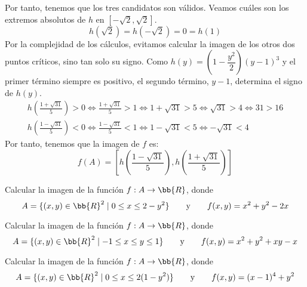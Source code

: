 \begin{ejercicio}
    Por tanto, tenemos que los tres candidatos son válidos. Veamos cuáles son los extremos absolutos de $h$ en $[-\sqrt{2},\sqrt{2}]$.
    \begin{equation*}
        h\left(\sqrt{2}\right) = h\left(-\sqrt{2}\right) = 0 = h(1)
    \end{equation*}
    Por la complejidad de los cálculos, evitamos calcular la imagen de los otros dos puntos críticos, sino tan solo su signo.
    Como $h(y)= \left(1-\dfrac{y^2}{2}\right)(y-1)^3$ y el primer término siempre es positivo, el segundo término, $y-1$, determina el signo de $h(y)$.
    \begin{gather*}
        h\left(\frac{1+\sqrt{31}}{5}\right) > 0 \Longleftrightarrow
        \frac{1+\sqrt{31}}{5} > 1 \Longleftrightarrow
        1+\sqrt{31} > 5 \Longleftrightarrow
        \sqrt{31} > 4 \Longleftrightarrow 31 > 16 \\
        h\left(\frac{1-\sqrt{31}}{5}\right) < 0 \Longleftrightarrow
        \frac{1-\sqrt{31}}{5} < 1 \Longleftrightarrow
        1-\sqrt{31} < 5 \Longleftrightarrow
        -\sqrt{31} < 4
    \end{gather*}
    Por tanto, tenemos que la imagen de $f$ es:
    \begin{equation*}
        f(A) = \left[h\left(\frac{1-\sqrt{31}}{5}\right), h\left(\frac{1+\sqrt{31}}{5}\right)\right]
    \end{equation*}
\end{ejercicio}

\begin{ejercicio}
    Calcular la imagen de la función $f: A \to \bb{R}$, donde
    \begin{equation*}
        A = \{(x,y)\in \bb{R}^2\mid 0\leq x \leq 2-y^2\}
        \qquad \text{y} \qquad
        f(x,y)=x^2+y^2 -2x
    \end{equation*}

\end{ejercicio}

\begin{ejercicio}
    Calcular la imagen de la función $f: A \to \bb{R}$, donde
    \begin{equation*}
        A = \{(x,y)\in \bb{R}^2\mid -1 \leq x \leq y \leq 1\}
        \qquad \text{y} \qquad
        f(x,y)=x^2+y^2 +xy -x
    \end{equation*}

\end{ejercicio}


\begin{ejercicio}
   Calcular la imagen de la función $f:A\to \bb{R}$, donde
   \begin{equation*}
       A = \{(x,y)\in \bb{R}^2\mid 0\leq x \leq 2(1-y^2)\}
       \qquad \text{y} \qquad
       f(x,y)=(x-1)^4 + y^2
   \end{equation*}
\end{ejercicio}